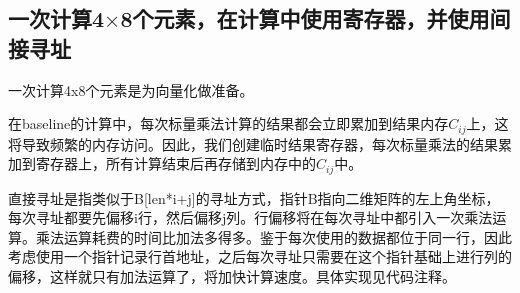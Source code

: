 \documentclass[UTF8,10pt]{ctexart}
\begin{document}
\subsection{一次计算4$\times $8个元素，在计算中使用寄存器，并使用间接寻址}
一次计算4x8个元素是为向量化做准备。

在baseline的计算中，每次标量乘法计算的结果都会立即累加到结果内存$C_{ij}$上，这将导致频繁的内存访问。因此，我们创建临时结果寄存器，每次标量乘法的结果累加到寄存器上，所有计算结束后再存储到内存中的$C_{ij}$中。

直接寻址是指类似于B[len*i+j]的寻址方式，指针B指向二维矩阵的左上角坐标，每次寻址都要先偏移i行，然后偏移j列。行偏移将在每次寻址中都引入一次乘法运算。乘法运算耗费的时间比加法多得多。鉴于每次使用的数据都位于同一行，因此考虑使用一个指针记录行首地址，之后每次寻址只需要在这个指针基础上进行列的偏移，这样就只有加法运算了，将加快计算速度。具体实现见代码注释。
\end{document}

